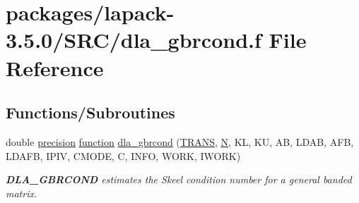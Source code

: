 \hypertarget{dla__gbrcond_8f}{}\section{packages/lapack-\/3.5.0/\+S\+R\+C/dla\+\_\+gbrcond.f File Reference}
\label{dla__gbrcond_8f}
\subsection*{Functions/\+Subroutines}
\begin{DoxyCompactItemize}
\item 
double \hyperlink{numinquire_8h_a2c8e616467665d0b2814d4c1589ba74e}{precision} \hyperlink{afunc_8m_a7b5e596df91eadea6c537c0825e894a7}{function} \hyperlink{group__doubleGBcomputational_gaaba1ee21e8fd1cd00fb281569f2c2d0a}{dla\+\_\+gbrcond} (\hyperlink{superlu__enum__consts_8h_a0c4e17b2d5cea33f9991ccc6a6678d62a1f61e3015bfe0f0c2c3fda4c5a0cdf58}{T\+R\+A\+N\+S}, \hyperlink{polmisc_8c_a0240ac851181b84ac374872dc5434ee4}{N}, K\+L, K\+U, A\+B, L\+D\+A\+B, A\+F\+B, L\+D\+A\+F\+B, I\+P\+I\+V, C\+M\+O\+D\+E, C, I\+N\+F\+O, W\+O\+R\+K, I\+W\+O\+R\+K)
\begin{DoxyCompactList}\small\item\em {\bfseries D\+L\+A\+\_\+\+G\+B\+R\+C\+O\+N\+D} estimates the Skeel condition number for a general banded matrix. \end{DoxyCompactList}\end{DoxyCompactItemize}

